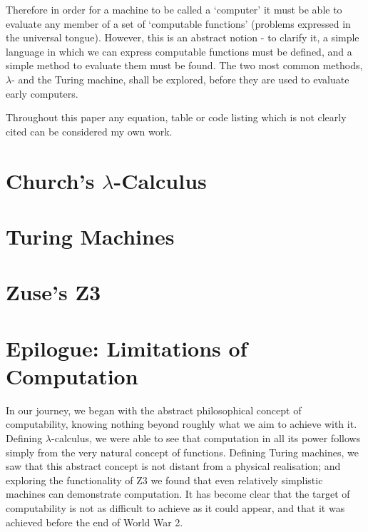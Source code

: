 \documentclass {article}
\begin{document}
Therefore in order for a machine to be called a `computer' it must be able to evaluate any member of a set of `computable functions' (problems expressed in the universal tongue). However, this is an abstract notion - to clarify it, a simple language in which we can express computable functions must be defined, and a simple method to evaluate them must be found. The two most common methods, $\lambda$-
and the Turing machine, shall be explored, before they are used to evaluate early computers.

Throughout this paper any equation, table or code listing which is not clearly cited can be considered my own work.

\clearpage

\section{Church's $\lambda$-Calculus}



\section{Turing Machines}



\section{Zuse's Z3}



\section*{Epilogue: Limitations of Computation}

In our journey, we began with the abstract philosophical concept of computability, knowing nothing beyond roughly what we aim to achieve with it. Defining $\lambda$-calculus, we were able to see that computation in all its power follows simply from the very natural concept of functions. Defining Turing machines, we saw that this abstract concept is not distant from a physical realisation; and exploring the functionality of Z3 we found that even relatively simplistic machines can demonstrate computation. It has become clear that the target of computability is not as difficult to achieve as it could appear, and that it was achieved before the end of World War 2.
\end{document}
